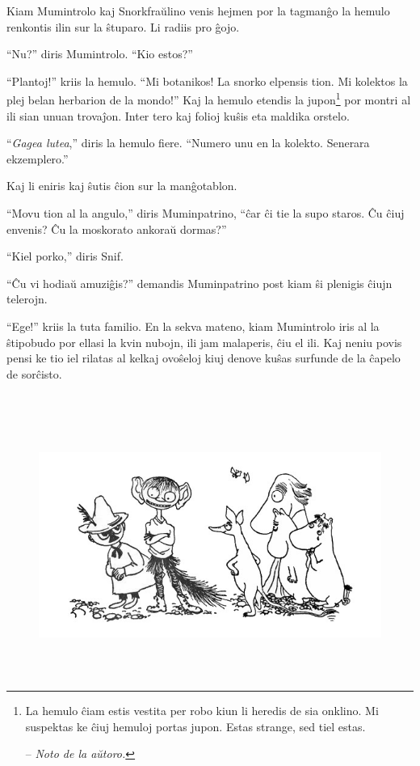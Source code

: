 Kiam Mumintrolo kaj Snorkfraŭlino venis hejmen por la tagmanĝo la hemulo renkontis ilin sur la ŝtuparo. Li radiis pro ĝojo.

``Nu?'' diris Mumintrolo. ``Kio estos?''

``Plantoj!'' kriis la hemulo. ``Mi botanikos! La snorko elpensis tion. Mi kolektos la plej belan herbarion de la mondo!'' Kaj la hemulo etendis la jupon\footnote{La hemulo ĉiam estis vestita per robo kiun li heredis de sia onklino. Mi suspektas ke ĉiuj hemuloj portas jupon. Estas strange, sed tiel estas.

-- \emph{Noto de la aŭtoro.}} por montri al ili sian unuan trovaĵon. Inter tero kaj folioj kuŝis eta maldika orstelo.

``\emph{Gagea lutea},'' diris la hemulo fiere. ``Numero unu en la kolekto. Senerara ekzemplero.''

Kaj li eniris kaj ŝutis ĉion sur la manĝotablon.

``Movu tion al la angulo,'' diris Muminpatrino, ``ĉar ĉi tie la supo staros. Ĉu ĉiuj envenis? Ĉu la moskorato ankoraŭ dormas?''

``Kiel porko,'' diris Snif.

``Ĉu vi hodiaŭ amuziĝis?'' demandis Muminpatrino post kiam ŝi plenigis ĉiujn telerojn.

``Ege!'' kriis la tuta familio.
\sectionbreak
En la sekva mateno, kiam Mumintrolo iris al la ŝtipobudo por ellasi la kvin nubojn, ili jam malaperis, ĉiu el ili. Kaj neniu povis pensi ke tio iel rilatas al kelkaj ovoŝeloj kiuj denove kuŝas surfunde de la ĉapelo de sorĉisto.

\chapter[Dua Ĉapitro]{}


\begin{figure}[htbp]
\centering
\includegraphics[width=450pt,height=243pt]{_8.jpg}
\caption{}
\label{_8}
\end{figure}


